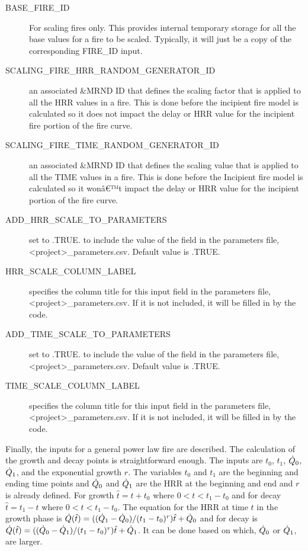 \documentclass[12pt,twoside]{book}
\begin{document}
\begin{description}
  \item[BASE\_FIRE\_ID] For scaling fires only. This provides internal temporary storage for all the base values for a fire to be scaled. Typically, it will just be a copy of the corresponding {\ct FIRE\_ID} input.
  \item[SCALING\_FIRE\_HRR\_RANDOM\_GENERATOR\_ID] an associated {\ct \&MRND} ID that defines the scaling factor that is applied to all the HRR values in a fire. This is done before the incipient fire model is calculated so it does not impact the delay or HRR value for the incipient fire portion of the fire curve.
  \item[SCALING\_FIRE\_TIME\_RANDOM\_GENERATOR\_ID] an associated {\ct \&MRND} ID that defines the  scaling value that is applied to all the TIME values in a fire. This is done before the Incipient fire model is calculated so it wonâ€™t impact the delay or HRR value for the incipient portion of the fire curve.
  \item[ADD\_HRR\_SCALE\_TO\_PARAMETERS] set to .TRUE. to include the value of the field in the parameters file, {\ct <project>\_parameters.csv}. Default value is .TRUE.
  \item[HRR\_SCALE\_COLUMN\_LABEL] specifies the column title for this input field in the parameters file, {\ct <project>\_parameters.csv}. If it is not included, it will be filled in by the code.
  \item[ADD\_TIME\_SCALE\_TO\_PARAMETERS] set to .TRUE. to include the value of the field in the parameters file, {\ct <project>\_parameters.csv}. Default value is .TRUE.
  \item[TIME\_SCALE\_COLUMN\_LABEL] specifies the column title for this input field in the parameters file, {\ct <project>\_parameters.csv}. If it is not included, it will be filled in by the code.
  \end{description}
  Finally, the inputs for a general power law fire are described. The calculation of the growth and decay points is straightforward enough. The inputs are $t_0$, $t_1$, $\dot{Q}_0$, $\dot{Q}_1$, and the exponential growth $r$. The variables $t_0$ and $t_1$ are the beginning and ending time points and $\dot{Q}_0$ and $\dot{Q}_1$ are the HRR at the beginning and end and $r$ is already defined. For growth $\hat{t} = t + t_0$ where $0<t<t_1 - t_0$ and for decay $\hat{t} = t_1 - t$ where $0<t<t_1 - t_0$. The equation for the HRR at time $t$ in the growth phase is $\dot{Q}(\hat{t}) = ((\dot{Q}_1 - \dot{Q}_0)/(t_1-t_0)^r)\hat{t} + \dot{Q}_0$ and for decay is $\dot{Q}(\hat{t}) = ((\dot{Q}_0 - \dot{Q}_1)/(t_1-t_0)^r)\hat{t} + \dot{Q}_1$. It can be done based on which, $\dot{Q}_0$ or $\dot{Q}_1$, are larger.
\end{document}
